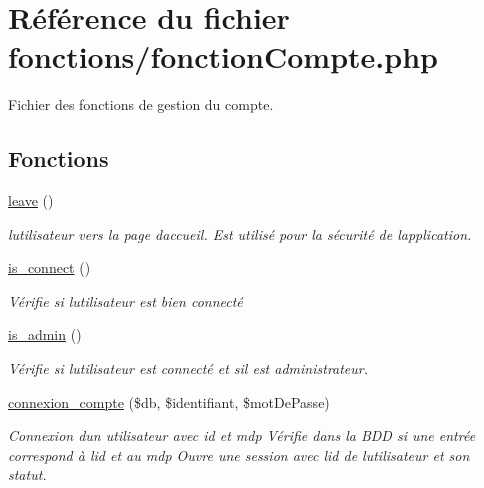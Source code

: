 \hypertarget{fonctionCompte_8php}{}\section{Référence du fichier fonctions/fonction\+Compte.php}
\label{fonctionCompte_8php}


Fichier des fonctions de gestion du compte.  


\subsection*{Fonctions}
\begin{DoxyCompactItemize}
\item 
\mbox{\label{fonctionCompte_8php_a8aee9a4b3e196b8ce9608eadd74bcb2d}} 
\hyperlink{fonctionCompte_8php_a8aee9a4b3e196b8ce9608eadd74bcb2d}{leave} ()
\begin{DoxyCompactList}\small\item\em l\textquotesingle{}utilisateur vers la page d\textquotesingle{}accueil. Est utilisé pour la sécurité de l\textquotesingle{}application. \end{DoxyCompactList}\item 
\hyperlink{fonctionCompte_8php_a2fe594e0482307b8729ea37780d6f74b}{is\+\_\+connect} ()
\begin{DoxyCompactList}\small\item\em Vérifie si l\textquotesingle{}utilisateur est bien connecté \end{DoxyCompactList}\item 
\hyperlink{fonctionCompte_8php_a0b327581800dba50ad70720e23ae2ed2}{is\+\_\+admin} ()
\begin{DoxyCompactList}\small\item\em Vérifie si l\textquotesingle{}utilisateur est connecté et s\textquotesingle{}il est administrateur. \end{DoxyCompactList}\item 
\hyperlink{fonctionCompte_8php_a926d0fa5076c218d81218748c600432a}{connexion\+\_\+compte} (\$db, \$identifiant, \$mot\+De\+Passe)
\begin{DoxyCompactList}\small\item\em Connexion d\textquotesingle{}un utilisateur avec id et mdp Vérifie dans la B\+DD si une entrée correspond à l\textquotesingle{}id et au mdp Ouvre une session avec l\textquotesingle{}id de l\textquotesingle{}utilisateur et son statut. \end{DoxyCompactList}\item 

\end{DoxyCompactItemize}
